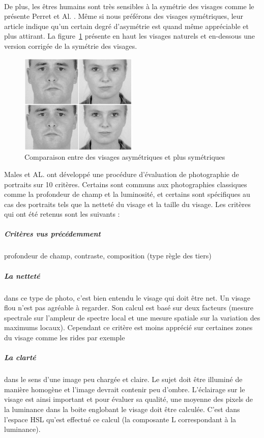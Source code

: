 \documentclass[11pt, french]{report-rd-info}
\begin{document}
\paragraph*{}
De plus, les êtres humains sont très sensibles à la symétrie des visages comme le présente Perret et Al. \cite{Perrett1999}. Même si nous préférons des visages symétriques, leur article indique qu'un certain degré d'asymétrie est quand même appréciable et plus attirant. La figure~\ref{fig:VisagesSymetriques} présente en haut les visages naturels et en-dessous une version corrigée de la symétrie des visages.
\begin{figure}
	\centering
	\includegraphics[width=0.5\textwidth]{Images/ea_visages_symetriques}
	\caption{Comparaison entre des visages asymétriques et plus symétriques\cite{Perrett1999}}
	\label{fig:VisagesSymetriques}
\end{figure}
Males et AL. \cite{Males2013} ont développé une procédure d'évaluation de photographie de portraits sur 10 critères. Certains sont communs aux photographies classiques comme la profondeur de champ et la luminosité, et certains sont spécifiques au cas des portraits tels que la netteté du visage et la taille du visage. Les critères qui ont été retenus sont les suivants :
\subparagraph{Critères vus précédemment} profondeur de champ, contraste, composition (type règle des tiers)
\subparagraph{La netteté} dans ce type de photo, c'est bien entendu le visage qui doit être net. Un visage flou n'est pas agréable à regarder. Son calcul est basé sur deux facteurs (mesure spectrale sur l’ampleur de spectre local et une mesure spatiale sur la variation des maximums locaux). Cependant ce critère est moins apprécié sur certaines zones du visage comme les rides par exemple
\subparagraph{La clarté} dans le sens d'une image peu chargée et claire. Le sujet doit être illuminé de manière homogène et l’image devrait contenir peu d’ombre. L’éclairage sur le visage est ainsi important et pour évaluer sa qualité, une moyenne des pixels de la luminance dans la boite englobant le visage doit être calculée. C’est dans l’espace HSL qu’est effectué ce calcul (la composante L correspondant à la luminance).
\end{document}
